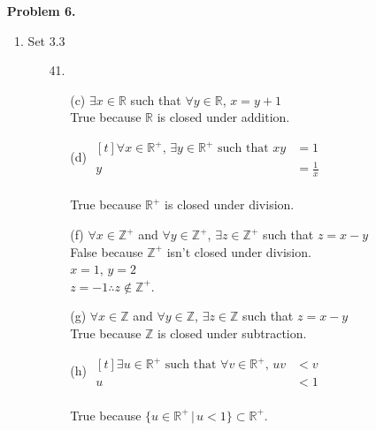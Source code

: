 \documentclass[letterpaper,fleqn]{article}
\begin{document}
\begin{enumerate}
\begin{enumerate}[]
\begin{enumerate}
			\end{enumerate}
		\end{enumerate}
		
		\item [] \textbf{Problem 6.}
		\begin{enumerate}[]
			\item Set 3.3
			\begin{enumerate}
				\item [41.] \quad
				\begin{enumerate}
					\item [(c)]
					$\exists x \in \mathbb{R}$ such that $\forall y \in \mathbb{R}$, $x=y+1$ \\
					True because $\mathbb{R}$ is closed under addition.
					
					\item [(d)]
					$\begin{aligned}[t]
						\forall x \in \mathbb{R}^+ \text{, } \exists y \in \mathbb{R}^+ \text{ such that } xy &=1 \\
						y &=\frac{1}{x}
					\end{aligned}$ \\\\
					True because $\mathbb{R}^+$ is closed under division.
					
					\item [(f)]
					$\forall x \in \mathbb{Z}^+$ and $\forall y \in \mathbb{Z}^+$, $\exists z \in \mathbb{Z}^+$ such that $z=x-y$ \\
					False because $\mathbb{Z}^+$ isn't closed under division. \\
					$x=1$, $y=2$ \\
					$z=-1 \therefore z \not\in \mathbb{Z}^+$.
					
					
					
					\item [(g)]
					$\forall x \in \mathbb{Z}$ and $\forall y \in \mathbb{Z}$, $\exists z \in \mathbb{Z}$ such that $z=x-y$ \\
					True because $\mathbb{Z}$ is closed under subtraction.
					
					\item [(h)]
					$\begin{aligned}[t]
						\exists u \in \mathbb{R}^+ \text{ such that } \forall v \in \mathbb{R}^+ \text{, } uv &<v \\
						u &< 1
					\end{aligned}$ \\\\
					True because $\{u \in \mathbb{R}^+ \,|\, u<1\} \subset \mathbb{R}^+$.
					

\end{enumerate}
\end{enumerate}
\end{enumerate}
\end{enumerate}
\end{document}
